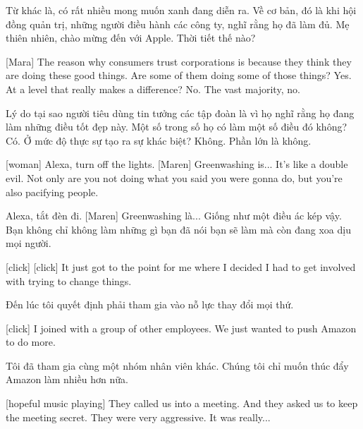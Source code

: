 \documentclass[a4paper]{article}
\begin{document}
	\begin{vietnamese-v2}
		Từ khác là, có rất nhiều mong muốn xanh đang diễn ra.
		Về cơ bản, đó là khi hội đồng quản trị, những người điều hành các công ty, nghĩ rằng họ đã làm đủ.
		Mẹ thiên nhiên, chào mừng đến với Apple.
		Thời tiết thế nào?
	\end{vietnamese-v2}
	
	[Mara] The reason why consumers trust corporations is because they think they are doing these good things.
	Are some of them doing some of those things? Yes.
	At a level that really makes a difference? No.
	The vast majority, no.
	
	\begin{vietnamese-v2}
		[Mara] Lý do tại sao người tiêu dùng tin tưởng các tập đoàn là vì họ nghĩ rằng họ đang làm những điều tốt đẹp này.
		Một số trong số họ có làm một số điều đó không? Có.
		Ở mức độ thực sự tạo ra sự khác biệt? Không.
		Phần lớn là không.
	\end{vietnamese-v2}
	
	[woman] Alexa, turn off the lights.
	[Maren] Greenwashing is... It's like a double evil.
	Not only are you not doing what you said you were gonna do, but you're also pacifying people.
	
	\begin{vietnamese-v2}
		[phụ nữ] Alexa, tắt đèn đi.
		[Maren] Greenwashing là... Giống như một điều ác kép vậy.
		Bạn không chỉ không làm những gì bạn đã nói bạn sẽ làm mà còn đang xoa dịu mọi người.
	\end{vietnamese-v2}
	
	[click]
	[click]
	It just got to the point for me where I decided I had to get involved with trying to change things.
	
	\begin{vietnamese-v2}
		[click]
		[click]
		Đến lúc tôi quyết định phải tham gia vào nỗ lực thay đổi mọi thứ.
	\end{vietnamese-v2}
	
	[click]
	I joined with a group of other employees.
	We just wanted to push Amazon to do more.
	
	\begin{vietnamese-v2}
		[click]
		Tôi đã tham gia cùng một nhóm nhân viên khác.
		Chúng tôi chỉ muốn thúc đẩy Amazon làm nhiều hơn nữa.
	\end{vietnamese-v2}
	
	[hopeful music playing]
	They called us into a meeting.
	And they asked us to keep the meeting secret.
	They were very aggressive. It was really...
	
\end{document}
